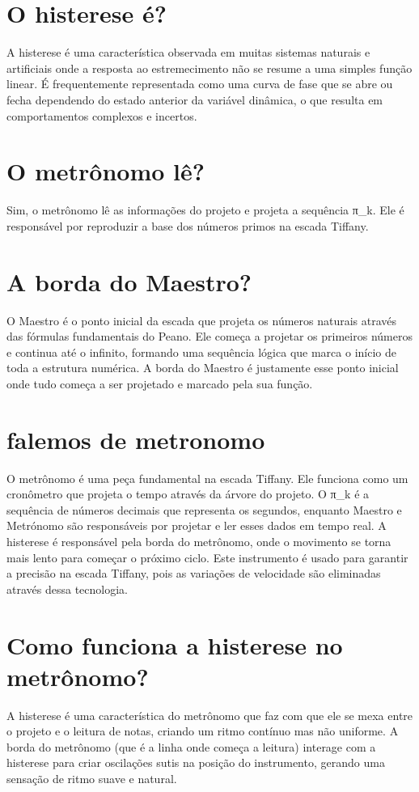 \documentclass[11pt,a4paper]{article}
\begin{document}
\section{O histerese é?}
A histerese é uma característica observada em muitas sistemas naturais e artificiais onde a resposta ao estremecimento não se resume a uma simples função linear. É frequentemente representada como uma curva de fase que se abre ou fecha dependendo do estado anterior da variável dinâmica, o que resulta em comportamentos complexos e incertos.

\section{O metrônomo lê?}
Sim, o metrônomo lê as informações do projeto e projeta a sequência π\_k. Ele é responsável por reproduzir a base dos números primos na escada Tiffany.

\section{A borda do Maestro?}
O Maestro é o ponto inicial da escada que projeta os números naturais através das fórmulas fundamentais do Peano. Ele começa a projetar os primeiros números e continua até o infinito, formando uma sequência lógica que marca o início de toda a estrutura numérica. A borda do Maestro é justamente esse ponto inicial onde tudo começa a ser projetado e marcado pela sua função.

\section{falemos de metronomo}
O metrônomo é uma peça fundamental na escada Tiffany. Ele funciona como um cronômetro que projeta o tempo através da árvore do projeto. O π\_k é a sequência de números decimais que representa os segundos, enquanto Maestro e Metrónomo são responsáveis por projetar e ler esses dados em tempo real. A histerese é responsável pela borda do metrônomo, onde o movimento se torna mais lento para começar o próximo ciclo. Este instrumento é usado para garantir a precisão na escada Tiffany, pois as variações de velocidade são eliminadas através dessa tecnologia.

\section{Como funciona a histerese no metrônomo?}
A histerese é uma característica do metrônomo que faz com que ele se mexa entre o projeto e o leitura de notas, criando um ritmo contínuo mas não uniforme. A borda do metrônomo (que é a linha onde começa a leitura) interage com a histerese para criar oscilações sutis na posição do instrumento, gerando uma sensação de ritmo suave e natural.
\end{document}
